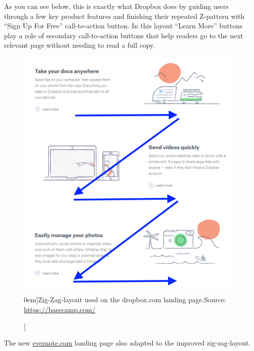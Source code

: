 As you can see below, this is exactly what Dropbox does by guiding users through a few key product features and finishing their repeated Z-pattern with “Sign Up For Free” call-to-action button. In this layout “Learn More” buttons play a role of secondary call-to-action buttons that help readers go to the next relevant page without needing to read a full copy.

\begin{figure}%
  \includegraphics[width=1.0\textwidth]{../figures/zig-zag_dropbox.png}
  \caption[][0em]{Zig-Zag-layout used on the dropbox.com landing page.\newline Source: \url{https://basecamp.com/}}
  \label{fig:zig-zag_dropbox}
\end{figure}

The new \url{evernote.com} landing page also adapted to the improved zig-zag-layout.

